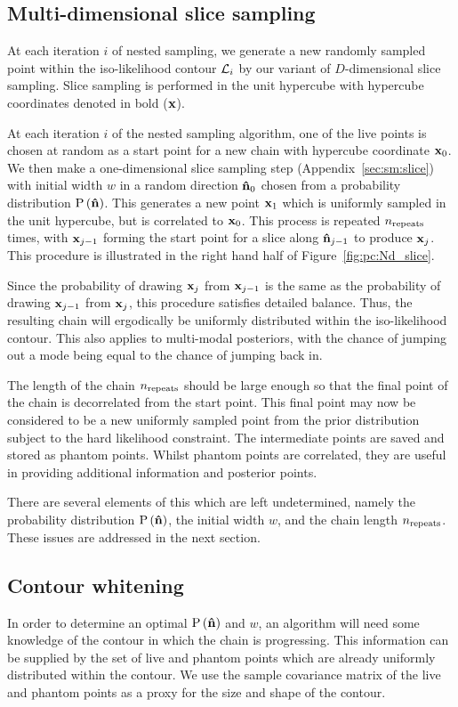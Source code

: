 \subsection{Multi-dimensional slice sampling}
\label{sec:pc:multi_slice}
At each iteration \(i\) of nested sampling, we generate a new randomly sampled point within the iso-likelihood contour \(\mathcal{L}_i\) by our variant of \(D\)-dimensional slice sampling.
Slice sampling is performed in the unit hypercube with hypercube coordinates denoted in bold (\(\mathbf{x}\)).

At each iteration \(i\) of the nested sampling algorithm, one of the live points is chosen at random as a start point for a new chain with hypercube coordinate \(\mathbf{x}_{0}\). We then make a one-dimensional slice sampling step (Appendix~\protect\ref{sec:sm:slice}) with initial width \(w\) in a random direction \(\mathbf{\hat{n}}_{0}\) chosen from a probability distribution \(\mathrm{P}\left(\mathbf{\hat{n}}\right)\). This generates a new point \(\mathbf{x}_{1}\) which is uniformly sampled in the unit hypercube, but is correlated to \(\mathbf{x}_{0}\). This process is repeated \(n_{\mathrm{repeats}}\) times, with \(\mathbf{x}_{j-1}\) forming the start point for a slice along \(\mathbf{\hat{n}}_{j-1}\) to produce \(\mathbf{x}_{j}\). This procedure is illustrated in the right hand half of Figure~\ref{fig:pc:Nd_slice}.

Since the probability of drawing \(\mathbf{x}_{j}\) from \(\mathbf{x}_{j-1}\) is the same as the probability of drawing \(\mathbf{x}_{j-1}\) from \(\mathbf{x}_{j}\), this procedure satisfies detailed balance. Thus, the resulting chain will ergodically be uniformly distributed within the iso-likelihood contour. This also applies to multi-modal posteriors, with the chance of jumping out a mode being equal to the chance of jumping back in.

The length of the chain \(n_{\mathrm{repeats}}\) should be large enough so that the final point of the chain is decorrelated from the start point. 
This final point may now be considered to be a new uniformly sampled point from the prior distribution subject to the hard likelihood constraint. The intermediate points are saved and stored as phantom points. Whilst phantom points are correlated, they are useful in providing additional information and posterior points.

There are several elements of this which are left undetermined, namely the probability distribution \(\mathrm{P}\left(\mathbf{\hat{n}}\right)\), the initial width \(w\), and the chain length \(n_{\mathrm{repeats}}\). These issues are addressed in the next section.


\subsection{Contour whitening}
\label{sec:pc:cont_white}
In order to determine an optimal \(\mathrm{P}\left(\mathbf{\hat{n}}\right)\) and \(w\), an algorithm will need some knowledge of the contour in which the chain is progressing. This information can be supplied by the set of live and phantom points which are already uniformly distributed within the contour. We use the sample covariance matrix of the live and phantom points as a proxy for the size and shape of the contour.


